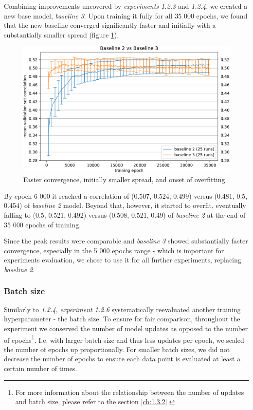 Combining improvements uncovered by \emph{experiments 1.2.3} and \emph{1.2.4}, we created a new base model, \emph{baseline 3}. Upon training it fully for all 35 000 epochs, we found that the new baseline converged significantly faster and initially with a substantially smaller spread (figure \ref{fig:5.1.2.5}). 

\begin{figure}[H]
    \centering
    \includegraphics[width=1\textwidth]{../figures/05_1_2_5}
    \caption[Experiment 1.2.5]{Faster convergence, initially smaller spread, and onset of overfitting.}
    \label{fig:5.1.2.5}
\end{figure}

By epoch 6 000 it reached a correlation of (0.507, 0.524, 0.499) versus (0.481, 0.5, 0.454) of \emph{baseline 2} model. Beyond that, however, it started to overfit, eventually falling to (0.5, 0.521, 0.492) versus (0.508, 0.521, 0.49) of \emph{baseline 2} at the end of 35 000 epochs of training. 

Since the peak results were comparable and \emph{baseline 3} showed substantially faster convergence, especially in the 5 000 epochs range - which is important for experiments evaluation, we chose to use it for all further experiments, replacing \emph{baseline 2}.

\subsubsection{Batch size}

Similarly to \textit{1.2.4}, \textit{experiment 1.2.6} systematically reevaluated another training hyperparameter - the batch size. To ensure for fair comparison, throughout the experiment we conserved the number of model updates as opposed to the number of epochs\footnote{For more information about the relationship between the number of updates and batch size, please refer to the section \ref{ch:1.3.2}.}. I.e. with larger batch size and thus less updates per epoch, we scaled the number of epochs up proportionally. For smaller batch sizes, we did not decrease the number of epochs to ensure each data point is evaluated at least a certain number of times.

